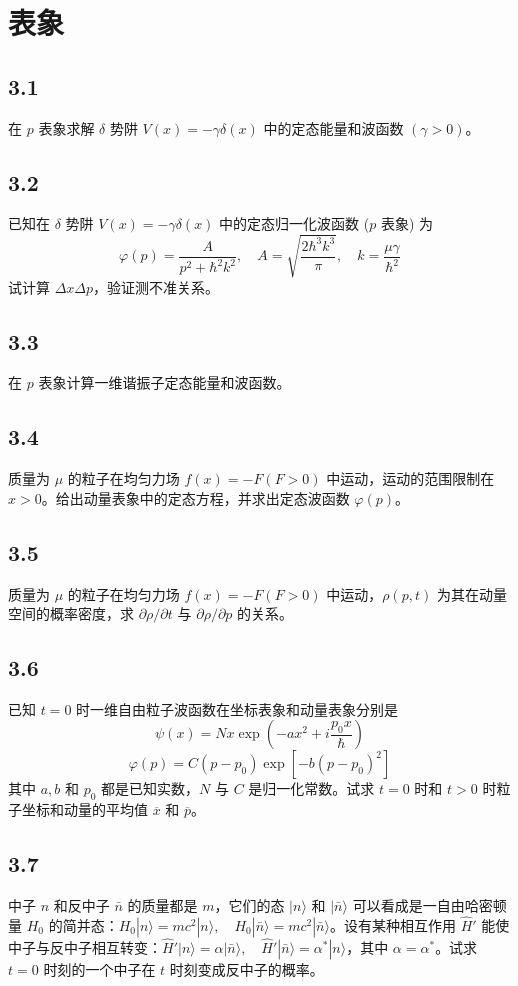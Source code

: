 \section{表象}

\subsection{3.1}
在 $p$ 表象求解 $\delta$ 势阱 $V(x) = -\gamma \delta(x)$ 中的定态能量和波函数 $(\gamma > 0)$。

\subsection{3.2}
已知在 $\delta$ 势阱 $V(x) = - \gamma \delta (x)$ 中的定态归一化波函数 ($p$ 表象) 为
$$\varphi(p) = \frac{A}{p^2 + \hbar^2 k^2}, \quad A = \sqrt{\frac{2 \hbar^3 k^3}{\pi}}, \quad k = \frac{\mu \gamma}{\hbar^2}$$
试计算 $\Delta x \Delta p$，验证测不准关系。

\subsection{3.3}
在 $p$ 表象计算一维谐振子定态能量和波函数。

\subsection{3.4}
质量为 $\mu$ 的粒子在均匀力场 $f(x) = -F(F > 0)$ 中运动，运动的范围限制在 $x > 0$。给出动量表象中的定态方程，并求出定态波函数 $\varphi(p)$。

\subsection{3.5}
质量为 $\mu$ 的粒子在均匀力场 $f(x) = -F(F > 0)$ 中运动，$\rho(p, t)$ 为其在动量空间的概率密度，求 $\partial \rho / \partial t $ 与 $\partial \rho / \partial p$ 的关系。

\subsection{3.6}
已知 $t = 0$ 时一维自由粒子波函数在坐标表象和动量表象分别是
$$\psi(x) = Nx \exp \left( -ax^2 + i \frac{p_0 x}{\hbar} \right)$$
$$\varphi(p) = C(p - p_0) \exp \left[ -b(p - p_0)^2 \right]$$
其中 $a, b$ 和 $p_0$ 都是已知实数，$N$ 与 $C$ 是归一化常数。试求 $t = 0$ 时和 $t > 0$ 时粒子坐标和动量的平均值 $\overline{x}$ 和 $\overline{p}$。

\subsection{3.7}
中子 $n$ 和反中子 $\bar{n}$ 的质量都是 $m$，它们的态 $|n\rangle$ 和 $|\bar{n}\rangle$ 可以看成是一自由哈密顿量 $H_0$ 的简并态：$H_0 |n\rangle = mc^2 |n\rangle, \quad H_0 |\bar{n}\rangle = mc^2 |\bar{n}\rangle$。设有某种相互作用 $\hat{H}'$ 能使中子与反中子相互转变：$\hat{H}' |n\rangle = \alpha |\bar{n}\rangle, \quad \hat{H}' |\bar{n}\rangle = \alpha^{*} |n\rangle$，其中 $\alpha = \alpha^{*}$。试求 $t = 0$ 时刻的一个中子在 $t$ 时刻变成反中子的概率。

